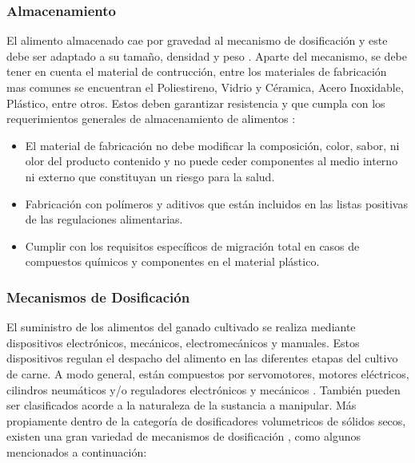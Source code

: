 	
\subsubsection{Almacenamiento}
El alimento almacenado cae por gravedad al mecanismo de dosificación y este debe ser adaptado a su tamaño, densidad y peso \cite{pinturan}. Aparte del mecanismo, se debe tener en cuenta el material de contrucción, entre los materiales de fabricación mas comunes se encuentran el Poliestireno, Vidrio  y Céramica, Acero Inoxidable, Plástico,  entre otros. Estos deben garantizar resistencia y que cumpla con los requerimientos generales de almacenamiento de alimentos \cite{casti}:
\begin{itemize}
	\item El material de fabricación no debe modificar la composición, color, sabor, ni olor del producto contenido y no puede ceder componentes al medio interno ni externo que constituyan un riesgo para la salud.
	\item Fabricación con polímeros y aditivos que están incluidos en las listas positivas de las regulaciones alimentarias.
	\item Cumplir con los requisitos específicos de migración total en casos de compuestos químicos y componentes en el material plástico.
\end{itemize}


\subsubsection{Mecanismos de Dosificación}
El suministro de los alimentos del ganado cultivado se realiza mediante dispositivos electrónicos, mecánicos, electromecánicos y manuales. Estos dispositivos regulan el despacho del alimento en las diferentes etapas del cultivo de carne. A modo general, están compuestos por servomotores, motores eléctricos, cilindros neumáticos y/o reguladores electrónicos y mecánicos \cite{pinturan}. 
También pueden ser clasificados acorde a la naturaleza de la sustancia a manipular. Más propiamente dentro de la categoría de dosificadores volumetricos de sólidos secos, existen una gran variedad de mecanismos de dosificación  \cite{torres}, como algunos mencionados a continuación:

